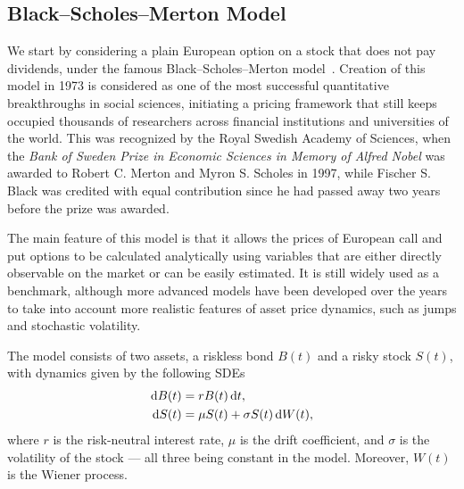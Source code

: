 \documentclass{UUThesisTemplate}
\begin{document}
%
\subsection{Black--Scholes--Merton Model}
\label{sub:bs}

\par
We start by considering a plain European option on a stock that does not pay dividends, under the famous Black--Scholes--Merton model~\cite{black73,merton73}. Creation of this model in 1973 is considered as one of the most successful quantitative breakthroughs in social sciences, initiating a pricing framework that still keeps occupied thousands of researchers across financial institutions and universities of the world. This was recognized by the Royal Swedish Academy of Sciences, when the \emph{Bank of Sweden Prize in Economic Sciences in Memory of Alfred Nobel} was awarded to Robert C. Merton and Myron S. Scholes in 1997, while Fischer S. Black was credited with equal contribution since he had passed away two years before the prize was awarded. 

\par
The main feature of this model is that it allows the prices of European call and put options to be calculated analytically using variables that are either directly observable on the market or can be easily estimated. It is still widely used as a benchmark, although more advanced models have been developed over the years to take into account more realistic features of asset price dynamics, such as jumps and stochastic volatility.

\par
The model consists of two assets, a riskless bond $B(t)$ and a risky stock $S(t)$, with dynamics given by the following SDEs
\begin{align}
\dif B(t) &= r B(t) \dif t, \label{eq:bond} \\
\dif S(t) &= \mu S(t) + \sigma S(t) \dif W(t), \label{eq:stock}
\end{align}
where $r$ is the risk-neutral interest rate, $\mu$ is the drift coefficient, and $\sigma$ is the volatility of the stock --- all three being constant in the model. Moreover, $W(t)$ is the Wiener process.
\end{document}
